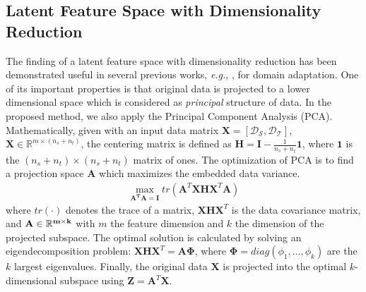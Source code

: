 \documentclass[10pt,twocolumn,letterpaper]{article}
\begin{document}
\begin{CJK*}{UTF8}{gkai}
\subsection{Latent Feature Space with Dimensionality Reduction}
The finding of a latent feature space  with dimensionality reduction  has been demonstrated useful in several previous works, \textit{e.g.}, \cite{pan2008transfer,pan2011domain,long2013transfer}, for domain adaptation.  One of its important properties is that  original data is projected to a lower dimensional space which is considered as \emph{principal} structure of data. In the proposed method, we also apply the Principal Component Analysis (PCA).  Mathematically, given with an input data matrix $\boldsymbol{X} = [{\mathcal{D_S}},\mathcal{D_T}]$, $\boldsymbol{X} \in {\mathbb{R}^{m\times({n_s} + {n_t})}}$, the centering matrix is defined as  $\boldsymbol{H} = \boldsymbol{I} - \frac{1}{n_s+n_t}\boldsymbol{1}$, where $\boldsymbol{1}$ is the $(n_s+n_t) \times (n_s+n_t)$ matrix of ones. The optimization of PCA is to find a projection space $\boldsymbol{A}$ which  maximizes the embedded data variance.
\begin{equation}\label{eq:pca}
	\begin{array}{c}
		\mathop {\max}\limits_{\boldsymbol{A^TA} = \boldsymbol{I}} tr(\boldsymbol{A}^T\boldsymbol{ XH}\boldsymbol{X}^T \boldsymbol{A})
	\end{array}
\end{equation}
where $tr(\mathord{\cdot})$ denotes the trace of a matrix,   $\boldsymbol{XH}\boldsymbol{X}^T$ is the data covariance matrix, and $\bf A \in \mathbb{R}^{m \times k}$ with $m$ the feature dimension and $k$ the dimension of the projected subspace. The optimal solution  is calculated by solving an eigendecomposition problem: $\boldsymbol{XH}\boldsymbol{X}^T=\boldsymbol{A\Phi}$, where $\boldsymbol{\Phi}=diag(\phi_1,\dots, \phi_k )$ are the $k$ largest eigenvalues. Finally, the original data $\boldsymbol{X}$ is projected into the  optimal $k$-dimensional subspace using $\boldsymbol{Z} = \boldsymbol{A}^T\boldsymbol{X}$. 



\end{CJK*}
\end{document}
